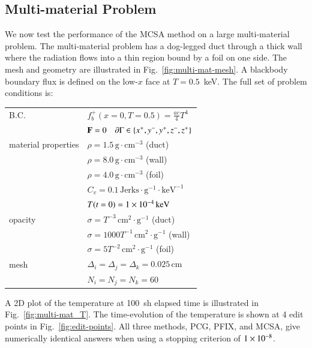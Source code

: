 \documentclass[preprint,12pt]{elsarticle}
\newcommand{\Cv}{\ensuremath{C_{v}}}
\newcommand{\Di}{\ensuremath{\Delta_i}}
\newcommand{\Dj}{\ensuremath{\Delta_j}}
\newcommand{\Dk}{\ensuremath{\Delta_k}}
\begin{document}
\subsection{Multi-material Problem}

We now test the performance of the MCSA method on a large
multi-material problem.  The multi-material problem has a dog-legged
duct through a thick wall where the radiation flows into a thin region
bound by a foil on one side.  The mesh and geometry are illustrated in
Fig.~\ref{fig:multi-mat-mesh}.  A blackbody boundary flux is defined
on the low-$x$ face at $T=0.5$~keV.  The full set of problem
conditions is:
\begin{center}
  \begin{tabular}{ll}\hline
    B.C. & $f_b^{+}(x=0,T=0.5) = \frac{ac}{4}T^4$\\
    & $\mathbf{F} = 0\quad \partial\Gamma \in \{x^{+}, y^{-}, y^{+},
    z^{-}, z^{+}\}$ \\
    material properties 
    & $\rho = 1.5\,\text{g}\cdot\text{cm}^{-3}$ (duct) \\
    & $\rho = 8.0\,\text{g}\cdot\text{cm}^{-3}$ (wall) \\
    & $\rho = 4.0\,\text{g}\cdot\text{cm}^{-3}$ (foil) \\
    & $\Cv = 0.1\,\text{Jerks}\cdot\text{g}^{-1}\cdot\text{keV}^{-1}$\\
    & $T(t=0) = 1\times 10^{-4}\,\text{keV}$\\
    opacity 
    & $\sigma = T^{-3}\,\text{cm}^2\cdot\text{g}^{-1}$ (duct) \\
    & $\sigma = 1000T^{-1}\,\text{cm}^2\cdot\text{g}^{-1}$ (wall) \\
    & $\sigma = 5T^{-2}\,\text{cm}^2\cdot\text{g}^{-1}$ (foil) \\
    mesh & $\Di = \Dj = \Dk = 0.025\,\text{cm}$ \\
    & $N_i =  N_j = N_k = 60$ \\
    \hline
  \end{tabular}
\end{center}
A 2D plot of the temperature at 100~sh elapsed time is illustrated in
Fig.~\ref{fig:multi-mat_T}.  The time-evolution of the temperature is
shown at 4 edit points in Fig.~\ref{fig:edit-points}.  All three
methods, PCG, PFIX, and MCSA, give numerically identical answers when
using a stopping criterion of $1\times 10^{-8}$.
\end{document}
